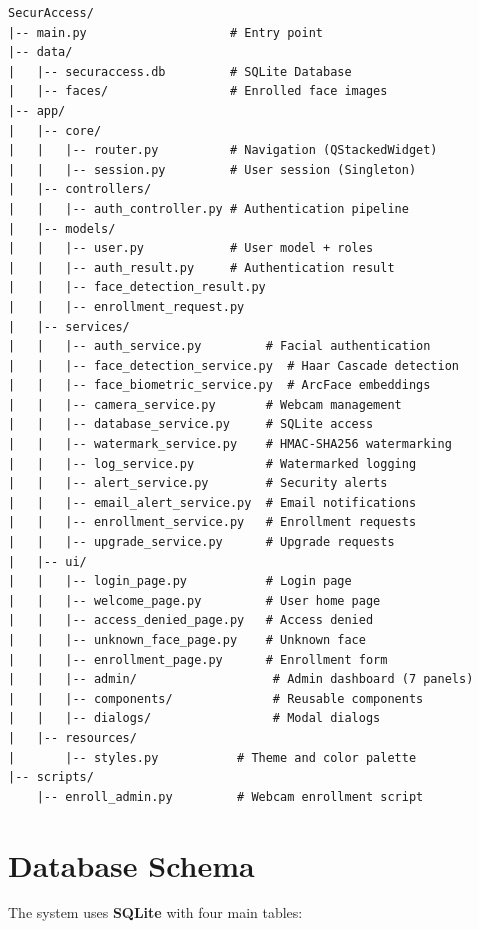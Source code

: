 \begin{lstlisting}[language={}, caption={Project Tree}]
SecurAccess/
|-- main.py                    # Entry point
|-- data/
|   |-- securaccess.db         # SQLite Database
|   |-- faces/                 # Enrolled face images
|-- app/
|   |-- core/
|   |   |-- router.py          # Navigation (QStackedWidget)
|   |   |-- session.py         # User session (Singleton)
|   |-- controllers/
|   |   |-- auth_controller.py # Authentication pipeline
|   |-- models/
|   |   |-- user.py            # User model + roles
|   |   |-- auth_result.py     # Authentication result
|   |   |-- face_detection_result.py
|   |   |-- enrollment_request.py
|   |-- services/
|   |   |-- auth_service.py         # Facial authentication
|   |   |-- face_detection_service.py  # Haar Cascade detection
|   |   |-- face_biometric_service.py  # ArcFace embeddings
|   |   |-- camera_service.py       # Webcam management
|   |   |-- database_service.py     # SQLite access
|   |   |-- watermark_service.py    # HMAC-SHA256 watermarking
|   |   |-- log_service.py          # Watermarked logging
|   |   |-- alert_service.py        # Security alerts
|   |   |-- email_alert_service.py  # Email notifications
|   |   |-- enrollment_service.py   # Enrollment requests
|   |   |-- upgrade_service.py      # Upgrade requests
|   |-- ui/
|   |   |-- login_page.py           # Login page
|   |   |-- welcome_page.py         # User home page
|   |   |-- access_denied_page.py   # Access denied
|   |   |-- unknown_face_page.py    # Unknown face
|   |   |-- enrollment_page.py      # Enrollment form
|   |   |-- admin/                   # Admin dashboard (7 panels)
|   |   |-- components/              # Reusable components
|   |   |-- dialogs/                 # Modal dialogs
|   |-- resources/
|       |-- styles.py           # Theme and color palette
|-- scripts/
    |-- enroll_admin.py         # Webcam enrollment script
\end{lstlisting}

\section{Database Schema}

The system uses \textbf{SQLite} with four main tables:

